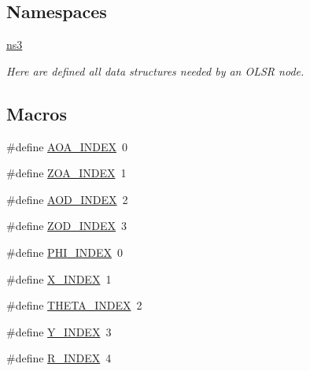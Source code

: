 \subsection*{Namespaces}
\begin{DoxyCompactItemize}
\item 
 \hyperlink{namespacens3}{ns3}
\begin{DoxyCompactList}\small\item\em Here are defined all data structures needed by an O\+L\+SR node. \end{DoxyCompactList}\end{DoxyCompactItemize}
\subsection*{Macros}
\begin{DoxyCompactItemize}
\item 
\#define \hyperlink{mmwave-3gpp-channel_8h_a7f1d5772b72f2ce425d85a2b41e8842f}{A\+O\+A\+\_\+\+I\+N\+D\+EX}~0
\item 
\#define \hyperlink{mmwave-3gpp-channel_8h_a86ab9a21bb66f50f7f4b0c0a0ee1f474}{Z\+O\+A\+\_\+\+I\+N\+D\+EX}~1
\item 
\#define \hyperlink{mmwave-3gpp-channel_8h_af0ca9ddb9e3346bd827d865de86dc5cb}{A\+O\+D\+\_\+\+I\+N\+D\+EX}~2
\item 
\#define \hyperlink{mmwave-3gpp-channel_8h_ae854b569d54c7f279a42fae34ad464f9}{Z\+O\+D\+\_\+\+I\+N\+D\+EX}~3
\item 
\#define \hyperlink{mmwave-3gpp-channel_8h_aac1933f496abe567e4380fc99112f6dc}{P\+H\+I\+\_\+\+I\+N\+D\+EX}~0
\item 
\#define \hyperlink{mmwave-3gpp-channel_8h_a023beaacdde3cbaf70604cf4da305e42}{X\+\_\+\+I\+N\+D\+EX}~1
\item 
\#define \hyperlink{mmwave-3gpp-channel_8h_a5d773c28fd925701ed291c2401cddff0}{T\+H\+E\+T\+A\+\_\+\+I\+N\+D\+EX}~2
\item 
\#define \hyperlink{mmwave-3gpp-channel_8h_a061187b89198cb94cc331d5a76476bc1}{Y\+\_\+\+I\+N\+D\+EX}~3
\item 
\#define \hyperlink{mmwave-3gpp-channel_8h_a8f6974deb00a9a41c7352e23e76b879a}{R\+\_\+\+I\+N\+D\+EX}~4
\end{DoxyCompactItemize}
